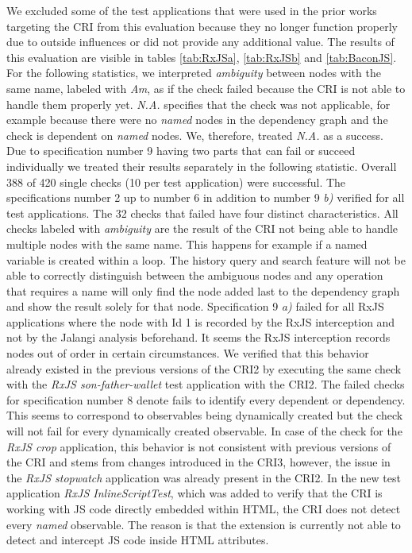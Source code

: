 We excluded some of the test applications that were used in the prior works targeting the CRI from this evaluation because they no longer function properly due to outside influences or did not provide any additional value. The results of this evaluation are visible in tables \ref{tab:RxJSa}, \ref{tab:RxJSb} and \ref{tab:BaconJS}. For the following statistics, we interpreted \emph{ambiguity} between nodes with the same name, labeled with \emph{Am}, as if the check failed because the CRI is not able to handle them properly yet. \emph{N.A.} specifies that the check was not applicable, for example because there were no \emph{named} nodes in the dependency graph and the check is dependent on \emph{named} nodes. We, therefore, treated \emph{N.A.} as a success. Due to specification number 9 having two parts that can fail or succeed individually we treated their results separately in the following statistic. Overall 388 of 420 single checks (10 per test application) were successful. The specifications number 2 up to number 6 in addition to number 9 \emph{b)} verified for all test applications. The 32 checks that failed have four distinct characteristics. All checks labeled with \emph{ambiguity} are the result of the CRI not being able to handle multiple nodes with the same name. This happens for example if a named variable is created within a loop. The history query and search feature will not be able to correctly distinguish between the ambiguous nodes and any operation that requires a name will only find the node added last to the dependency graph and show the result solely for that node. Specification 9 \emph{a)} failed for all RxJS applications where the node with Id 1 is recorded by the RxJS interception and not by the Jalangi analysis beforehand. It seems the RxJS interception records nodes out of order in certain circumstances. We verified that this behavior already existed in the previous versions of the CRI2 by executing the same check with the \emph{RxJS son-father-wallet} test application with the CRI2. The failed checks for specification number 8 denote fails to identify every dependent or dependency. This seems to correspond to observables being dynamically created but the check will not fail for every dynamically created observable. In case of the check for the \emph{RxJS crop} application, this behavior is not consistent with previous versions of the CRI and stems from changes introduced in the CRI3, however, the issue in the \emph{RxJS stopwatch} application was already present in the CRI2.
In the new test application \emph{RxJS InlineScriptTest}, which was added to verify that the CRI is working with JS code directly embedded within HTML, the CRI does not detect every \emph{named} observable. The reason is that the extension is currently not able to detect and intercept JS code inside HTML attributes.

